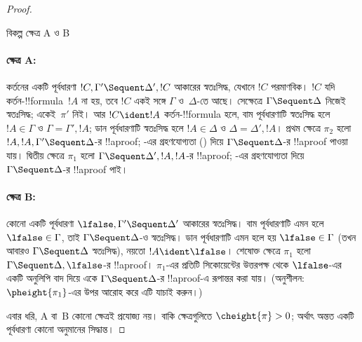 \documentclass[../../../include/open-logic-section]{subfiles}
\begin{document}
\begin{proof}
\begin{center}
বিকল্প ক্ষেত্র A ও B
\end{center}

\paragraph{ক্ষেত্র A:} কর্তনের একটি পূর্বধারণা
$!C, \Gamma' \Sequent \Delta', !C$ আকারের স্বতঃসিদ্ধ, যেখানে
$!C$ পরমাণবিক। $!C$ যদি কর্তন-!!{formula}~$!A$ না হয়, তবে
$!C$ একই সঙ্গে $\Gamma$ ও~$\Delta$-তে আছে। সেক্ষেত্রে
$\Gamma \Sequent \Delta$ নিজেই স্বতঃসিদ্ধ; একেই~$\pi'$ নিই।
আর $!C \ident !A$ কর্তন-!!{formula} হলে, বাম পূর্বধারণাটি স্বতঃসিদ্ধ হলে
$!A \in \Gamma$ ও $\Gamma = \Gamma', !A$; ডান পূর্বধারণাটি
স্বতঃসিদ্ধ হলে $!A \in \Delta$ ও $\Delta = \Delta', !A$।
প্রথম ক্ষেত্রে $\pi_2$ হলো
$!A, !A, \Gamma' \Sequent \Delta$-র !!a{proof};
\LeftR{\Contraction}-এর গ্রহণযোগ্যতা
() দিয়ে
$\Gamma \Sequent \Delta$-র !!a{proof} পাওয়া যায়। দ্বিতীয়
ক্ষেত্রে $\pi_1$ হলো
$\Gamma \Sequent \Delta', !A, !A$-র !!a{proof};
\RightR{\Contraction}-এর গ্রহণযোগ্যতা দিয়ে
$\Gamma \Sequent \Delta$-র !!a{proof} পাই।

\paragraph{ক্ষেত্র B:} কোনো একটি পূর্বধারণা
$\lfalse, \Gamma' \Sequent \Delta'$ আকারের স্বতঃসিদ্ধ। বাম
পূর্বধারণাটি এমন হলে $\lfalse \in \Gamma$, তাই
$\Gamma \Sequent \Delta$-ও স্বতঃসিদ্ধ। ডান পূর্বধারণাটি এমন
হলে হয় $\lfalse \in \Gamma$ (তখন আবারও
$\Gamma \Sequent \Delta$ স্বতঃসিদ্ধ), নয়তো
$!A \ident \lfalse$। শেষোক্ত ক্ষেত্রে $\pi_1$ হলো
$\Gamma \Sequent \Delta, \lfalse$-র !!a{proof}। $\pi_1$-এর
প্রতিটি সিকোয়েন্টের উত্তরপক্ষ থেকে $\lfalse$-এর একটি অনুলিপি
বাদ দিয়ে একে $\Gamma \Sequent \Delta$-র !!a{proof}-এ
রূপান্তর করা যায়। (অনুশীলন: $\pheight{\pi_1}$-এর উপর আরোহ
করে এটি যাচাই করুন।)

এবার ধরি, A বা~B কোনো ক্ষেত্রই প্রযোজ্য নয়। বাকি ক্ষেত্রগুলিতে
$\cheight{\pi} > 0$; অর্থাৎ অন্তত একটি পূর্বধারণা কোনো
অনুমানের সিদ্ধান্ত।


\end{proof}
\end{document}
